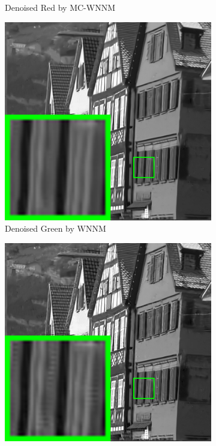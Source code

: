 \begin{figure}
\begin{subfigure}[t]{0.24\textwidth}
		\caption{Denoised Red by MC-WNNM}
    \end{subfigure}
    \hfill
    \begin{subfigure}[t]{0.24\textwidth}
        \centering
        \includegraphics[width=1\textwidth]{images/mcwnnm/br_WNNMJ_nSig402030_lambda1_kodim08_2.png}
		\caption{Denoised Green by WNNM}
    \end{subfigure}
    \hfill
    \begin{subfigure}[t]{0.24\textwidth}
        \centering
        \includegraphics[width=1\textwidth]{images/mcwnnm/br_CWNNM_ADMM_nSig402030_kodim08_2.png}

\end{subfigure}
\end{figure}
